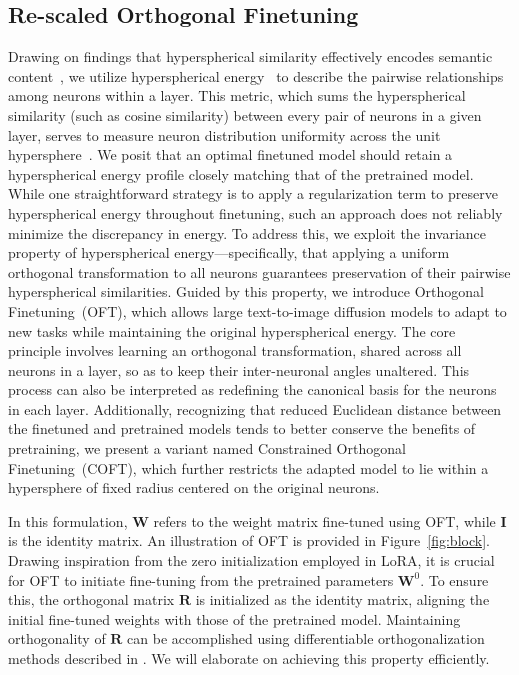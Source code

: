 \subsection{Re-scaled Orthogonal Finetuning}

Drawing on findings that hyperspherical similarity effectively encodes semantic content~\cite{liu2017deep,liu2018decoupled,chen2020angular}, we utilize hyperspherical energy~\cite{liu2018learning} to describe the pairwise relationships among neurons within a layer. This metric, which sums the hyperspherical similarity (such as cosine similarity) between every pair of neurons in a given layer, serves to measure neuron distribution uniformity across the unit hypersphere~\cite{liu2021learning}. We posit that an optimal finetuned model should retain a hyperspherical energy profile closely matching that of the pretrained model. While one straightforward strategy is to apply a regularization term to preserve hyperspherical energy throughout finetuning, such an approach does not reliably minimize the discrepancy in energy. To address this, we exploit the invariance property of hyperspherical energy—specifically, that applying a uniform orthogonal transformation to all neurons guarantees preservation of their pairwise hyperspherical similarities. Guided by this property, we introduce Orthogonal Finetuning~(OFT), which allows large text-to-image diffusion models to adapt to new tasks while maintaining the original hyperspherical energy. The core principle involves learning an orthogonal transformation, shared across all neurons in a layer, so as to keep their inter-neuronal angles unaltered. This process can also be interpreted as redefining the canonical basis for the neurons in each layer. Additionally, recognizing that reduced Euclidean distance between the finetuned and pretrained models tends to better conserve the benefits of pretraining, we present a variant named Constrained Orthogonal Finetuning~(COFT), which further restricts the adapted model to lie within a hypersphere of fixed radius centered on the original neurons.

In this formulation, $\bm{W}$ refers to the weight matrix fine-tuned using OFT, while $\bm{I}$ is the identity matrix. An illustration of OFT is provided in Figure~\ref{fig:block}. Drawing inspiration from the zero initialization employed in LoRA, it is crucial for OFT to initiate fine-tuning from the pretrained parameters $\bm{W}^0$. To ensure this, the orthogonal matrix $\bm{R}$ is initialized as the identity matrix, aligning the initial fine-tuned weights with those of the pretrained model. Maintaining orthogonality of $\bm{R}$ can be accomplished using differentiable orthogonalization methods described in \cite{liu2021orthogonal,lezcano2019cheap}. We will elaborate on achieving this property efficiently.

